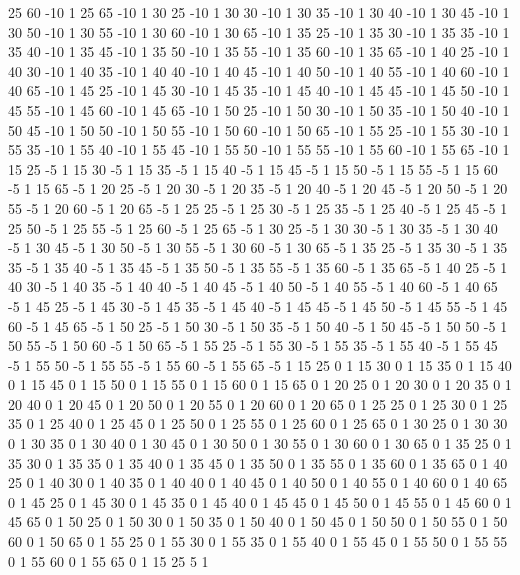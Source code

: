 	25	60	-10	1
	25	65	-10	1
	30	25	-10	1
	30	30	-10	1
	30	35	-10	1
	30	40	-10	1
	30	45	-10	1
	30	50	-10	1
	30	55	-10	1
	30	60	-10	1
	30	65	-10	1
	35	25	-10	1
	35	30	-10	1
	35	35	-10	1
	35	40	-10	1
	35	45	-10	1
	35	50	-10	1
	35	55	-10	1
	35	60	-10	1
	35	65	-10	1
	40	25	-10	1
	40	30	-10	1
	40	35	-10	1
	40	40	-10	1
	40	45	-10	1
	40	50	-10	1
	40	55	-10	1
	40	60	-10	1
	40	65	-10	1
	45	25	-10	1
	45	30	-10	1
	45	35	-10	1
	45	40	-10	1
	45	45	-10	1
	45	50	-10	1
	45	55	-10	1
	45	60	-10	1
	45	65	-10	1
	50	25	-10	1
	50	30	-10	1
	50	35	-10	1
	50	40	-10	1
	50	45	-10	1
	50	50	-10	1
	50	55	-10	1
	50	60	-10	1
	50	65	-10	1
	55	25	-10	1
	55	30	-10	1
	55	35	-10	1
	55	40	-10	1
	55	45	-10	1
	55	50	-10	1
	55	55	-10	1
	55	60	-10	1
	55	65	-10	1
	15	25	-5	1
	15	30	-5	1
	15	35	-5	1
	15	40	-5	1
	15	45	-5	1
	15	50	-5	1
	15	55	-5	1
	15	60	-5	1
	15	65	-5	1
	20	25	-5	1
	20	30	-5	1
	20	35	-5	1
	20	40	-5	1
	20	45	-5	1
	20	50	-5	1
	20	55	-5	1
	20	60	-5	1
	20	65	-5	1
	25	25	-5	1
	25	30	-5	1
	25	35	-5	1
	25	40	-5	1
	25	45	-5	1
	25	50	-5	1
	25	55	-5	1
	25	60	-5	1
	25	65	-5	1
	30	25	-5	1
	30	30	-5	1
	30	35	-5	1
	30	40	-5	1
	30	45	-5	1
	30	50	-5	1
	30	55	-5	1
	30	60	-5	1
	30	65	-5	1
	35	25	-5	1
	35	30	-5	1
	35	35	-5	1
	35	40	-5	1
	35	45	-5	1
	35	50	-5	1
	35	55	-5	1
	35	60	-5	1
	35	65	-5	1
	40	25	-5	1
	40	30	-5	1
	40	35	-5	1
	40	40	-5	1
	40	45	-5	1
	40	50	-5	1
	40	55	-5	1
	40	60	-5	1
	40	65	-5	1
	45	25	-5	1
	45	30	-5	1
	45	35	-5	1
	45	40	-5	1
	45	45	-5	1
	45	50	-5	1
	45	55	-5	1
	45	60	-5	1
	45	65	-5	1
	50	25	-5	1
	50	30	-5	1
	50	35	-5	1
	50	40	-5	1
	50	45	-5	1
	50	50	-5	1
	50	55	-5	1
	50	60	-5	1
	50	65	-5	1
	55	25	-5	1
	55	30	-5	1
	55	35	-5	1
	55	40	-5	1
	55	45	-5	1
	55	50	-5	1
	55	55	-5	1
	55	60	-5	1
	55	65	-5	1
	15	25	0	1
	15	30	0	1
	15	35	0	1
	15	40	0	1
	15	45	0	1
	15	50	0	1
	15	55	0	1
	15	60	0	1
	15	65	0	1
	20	25	0	1
	20	30	0	1
	20	35	0	1
	20	40	0	1
	20	45	0	1
	20	50	0	1
	20	55	0	1
	20	60	0	1
	20	65	0	1
	25	25	0	1
	25	30	0	1
	25	35	0	1
	25	40	0	1
	25	45	0	1
	25	50	0	1
	25	55	0	1
	25	60	0	1
	25	65	0	1
	30	25	0	1
	30	30	0	1
	30	35	0	1
	30	40	0	1
	30	45	0	1
	30	50	0	1
	30	55	0	1
	30	60	0	1
	30	65	0	1
	35	25	0	1
	35	30	0	1
	35	35	0	1
	35	40	0	1
	35	45	0	1
	35	50	0	1
	35	55	0	1
	35	60	0	1
	35	65	0	1
	40	25	0	1
	40	30	0	1
	40	35	0	1
	40	40	0	1
	40	45	0	1
	40	50	0	1
	40	55	0	1
	40	60	0	1
	40	65	0	1
	45	25	0	1
	45	30	0	1
	45	35	0	1
	45	40	0	1
	45	45	0	1
	45	50	0	1
	45	55	0	1
	45	60	0	1
	45	65	0	1
	50	25	0	1
	50	30	0	1
	50	35	0	1
	50	40	0	1
	50	45	0	1
	50	50	0	1
	50	55	0	1
	50	60	0	1
	50	65	0	1
	55	25	0	1
	55	30	0	1
	55	35	0	1
	55	40	0	1
	55	45	0	1
	55	50	0	1
	55	55	0	1
	55	60	0	1
	55	65	0	1
	15	25	5	1
